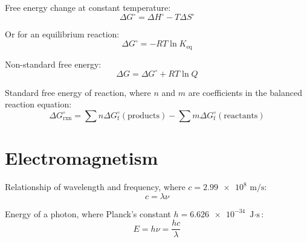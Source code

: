 \documentclass[10pt]{article}
\newcommand*\unit[1]{\textrm{ #1}}
\def\not{^\circ}
\def\cd{$\cdot$}
\begin{document}
Free energy change at constant temperature:
\begin{equation*}
\Delta G\not = \Delta H\not - T \Delta S\not
\end{equation*}

Or for an equilibrium reaction:
\begin{equation*}
\Delta G\not = -RT\ln K_{\textrm{eq}}
\end{equation*}

Non-standard free energy:
\begin{equation*}
\Delta G = \Delta G\not + RT\ln Q
\end{equation*}

Standard free energy of reaction, where $n$ and $m$ are coefficients in the balanced reaction equation:
\begin{equation*}
\Delta G\not_\textrm{rxn} = \sum{n\Delta G\not_\textrm{f}(\textrm{products})}-\sum{m\Delta G\not_\textrm{f}(\textrm{reactants})}
\end{equation*}





\newpage
\section{Electromagnetism}


Relationship of wavelength and frequency, where $c=\num{2.99e8}\unit{m/s}$:
\begin{equation*}
c = \lambda\nu
\end{equation*}

Energy of a photon, where Planck's constant $h=\num{6.626e-34}\unit{J\cd s}$:
\begin{equation*}
E = h\nu = \frac{hc}{\lambda}
\end{equation*}
\end{document}
